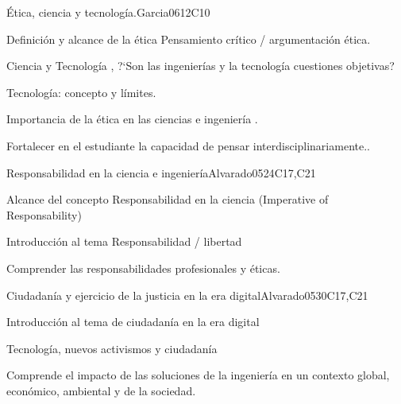 \begin{syllabus}
\begin{unit}{Ética, ciencia y tecnología.}{}{Garcia06}{12}{C10}
   \begin{topics}
      \item Definición y alcance de la ética Pensamiento crítico /  argumentación ética.
      \item Ciencia y Tecnología , ?`Son las ingenierías y la tecnología cuestiones objetivas? 
      \item Tecnología: concepto y límites.
      \item Importancia de la ética en las ciencias e ingeniería .
   \end{topics}
   \begin{learningoutcomes}
      \item Fortalecer en el estudiante la capacidad de pensar interdisciplinariamente..
   \end{learningoutcomes}
\end{unit}

\begin{unit}{Responsabilidad en la ciencia e ingeniería}{}{Alvarado05}{24}{C17,C21}
   \begin{topics}
      \item Alcance del concepto  Responsabilidad en la ciencia (Imperative of Responsability)
      \item Introducción al tema Responsabilidad / libertad 
      \end{topics}

   \begin{learningoutcomes}
      \item  Comprender las responsabilidades profesionales y éticas.
   \end{learningoutcomes}
\end{unit}

\begin{unit}{Ciudadanía y ejercicio de la justicia en la era digital}{}{Alvarado05}{30}{C17,C21}
   \begin{topics}
      \item Introducción al tema de ciudadanía en la era digital
      \item Tecnología,  nuevos activismos y ciudadanía
   \end{topics}

   \begin{learningoutcomes}
      \item Comprende el impacto de las soluciones de la ingeniería en un contexto global, económico, ambiental y de la sociedad.
   \end{learningoutcomes}
\end{unit}



\begin{coursebibliography}
\end{coursebibliography}

\end{syllabus}
